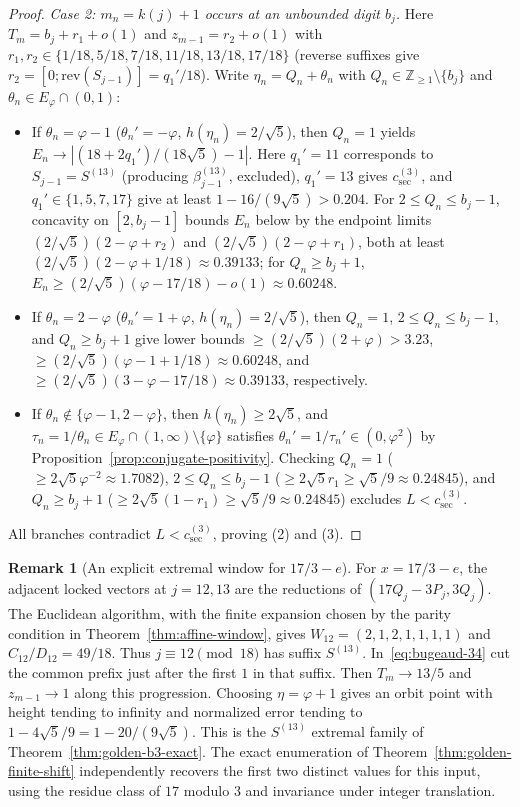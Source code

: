 \documentclass[11pt]{amsart}
\theoremstyle{definition}
\newtheorem{remark}[theorem]{Remark}
\theoremstyle{remark}
\numberwithin{equation}{section}
\newcommand{\Z}{\mathbb{Z}}
\begin{document}
\begin{proof}
\emph{Case 2: $m_n=k(j)+1$ occurs at an unbounded digit $b_j$.}
Here $T_m=b_j+r_1+o(1)$ and $z_{m-1}=r_2+o(1)$ with
$r_1,r_2\in\{1/18,5/18,7/18,11/18,13/18,17/18\}$ (reverse suffixes give
$r_2=[0;\mathrm{rev}(S_{j-1})]=q_1'/18$). Write $\eta_n=Q_n+\theta_n$ with
$Q_n\in\Z_{\ge1}\setminus\{b_j\}$ and $\theta_n\in E_\varphi\cap(0,1)$:
\begin{itemize}
\item If $\theta_n=\varphi-1$ ($\theta_n'=-\varphi$, $h(\eta_n)=2/\sqrt5$),
      then $Q_n=1$ yields $E_n\to|(18+2q_1')/(18\sqrt5)-1|$. Here $q_1'=11$
      corresponds to $S_{j-1}=S^{(13)}$ (producing $\beta_{j-1}^{(13)}$, excluded),
      $q_1'=13$ gives $c_{\mathrm{sec}}^{(3)}$, and $q_1'\in\{1,5,7,17\}$ give
      at least $1-16/(9\sqrt5)>0.204$. For $2\le Q_n\le b_j-1$, concavity on
      $[2,b_j-1]$ bounds $E_n$ below by the endpoint limits
      $(2/\sqrt5)(2-\varphi+r_2)$ and $(2/\sqrt5)(2-\varphi+r_1)$, both at
      least $(2/\sqrt5)(2-\varphi+1/18)\approx 0.39133$; for $Q_n\ge b_j+1$,
      $E_n\ge(2/\sqrt5)(\varphi-17/18)-o(1)\approx 0.60248$.
\item If $\theta_n=2-\varphi$ ($\theta_n'=1+\varphi$, $h(\eta_n)=2/\sqrt5$),
      then $Q_n=1$, $2\le Q_n\le b_j-1$, and $Q_n\ge b_j+1$ give lower bounds
      $\ge(2/\sqrt5)(2+\varphi)>3.23$, $\ge(2/\sqrt5)(\varphi-1+1/18)\approx0.60248$,
      and $\ge(2/\sqrt5)(3-\varphi-17/18)\approx0.39133$, respectively.
\item If $\theta_n\notin\{\varphi-1,2-\varphi\}$, then $h(\eta_n)\ge2\sqrt5$,
      and $\tau_n=1/\theta_n\in E_\varphi\cap(1,\infty)\setminus\{\varphi\}$
      satisfies $\theta_n'=1/\tau_n'\in(0,\varphi^2)$ by
      Proposition~\ref{prop:conjugate-positivity}. Checking $Q_n=1$
      ($\ge 2\sqrt5\varphi^{-2}\approx1.7082$), $2\le Q_n\le b_j-1$
      ($\ge 2\sqrt5 r_1\ge\sqrt5/9\approx0.24845$), and $Q_n\ge b_j+1$
      ($\ge 2\sqrt5(1-r_1)\ge\sqrt5/9\approx0.24845$) excludes $L<c_{\mathrm{sec}}^{(3)}$.
\end{itemize}
All branches contradict $L<c_{\mathrm{sec}}^{(3)}$, proving (2) and (3).
\end{proof}

\begin{remark}[An explicit extremal window for $17/3-e$]\label{rem:golden-b3-window}
For $x=17/3-e$, the adjacent locked vectors at $j=12,13$ are the
reductions of $(17Q_j-3P_j,3Q_j)$. The Euclidean algorithm, with the
finite expansion chosen by the parity condition in
Theorem~\ref{thm:affine-window}, gives
$W_{12}=(2,1,2,1,1,1,1)$ and $C_{12}/D_{12}=49/18$.
Thus $j\equiv12\pmod{18}$ has suffix $S^{(13)}$. In~\eqref{eq:bugeaud-34}
cut the common prefix just after the first $1$ in that suffix.
Then $T_m\to13/5$ and $z_{m-1}\to1$ along this progression.
Choosing $\eta=\varphi+1$ gives an orbit point with height tending
to infinity and normalized error tending to
$1-4\sqrt5/9=1-20/(9\sqrt5)$. This is the $S^{(13)}$ extremal
family of Theorem~\ref{thm:golden-b3-exact}. The exact enumeration of
Theorem~\ref{thm:golden-finite-shift} independently recovers the first
two distinct values for this input, using the residue class of $17$
modulo $3$ and invariance under integer translation.
\end{remark}
\end{document}
